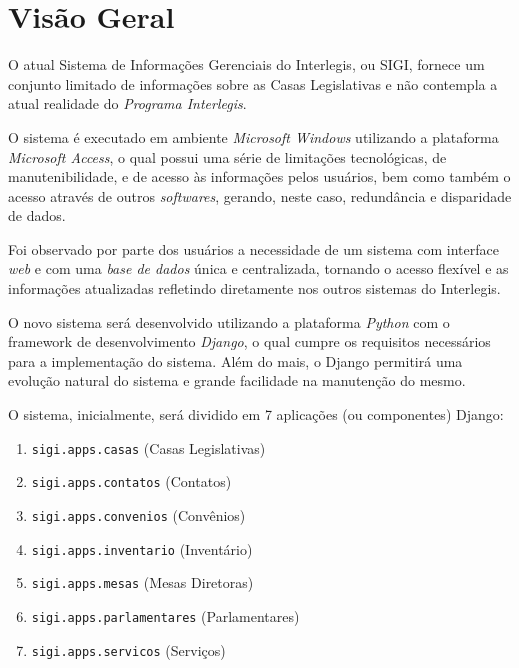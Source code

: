 %
%

\section{Visão Geral}
\label{sec:visaogeral}
O atual Sistema de Informações Gerenciais do Interlegis, ou SIGI,
fornece um conjunto limitado de informações sobre as Casas
Legislativas e não contempla a atual realidade do \emph{Programa
  Interlegis}.

O sistema é executado em ambiente \emph{Microsoft Windows} utilizando
a plataforma \emph{Microsoft Access}, o qual possui uma série de
limitações tecnológicas, de manutenibilidade, e de acesso às
informações pelos usuários, bem como também o acesso através de outros
\textit{softwares}, gerando, neste caso, redundância e disparidade de
dados.

Foi observado por parte dos usuários a necessidade de um sistema com
interface \textit{web} e com uma \emph{base de dados} única e
centralizada, tornando o acesso flexível e as informações atualizadas
refletindo diretamente nos outros sistemas do Interlegis.

O novo sistema será desenvolvido utilizando a plataforma \emph{Python}
com o framework de desenvolvimento \emph{Django}, o qual cumpre os
requisitos necessários para a implementação do sistema. Além do mais,
o Django permitirá uma evolução natural do sistema e grande facilidade
na manutenção do mesmo.

O sistema, inicialmente, será dividido em 7 aplicações (ou
componentes) Django:

\begin{enumerate}
\item \verb|sigi.apps.casas| (Casas Legislativas)
\item \verb|sigi.apps.contatos| (Contatos)
\item \verb|sigi.apps.convenios| (Convênios)
\item \verb|sigi.apps.inventario| (Inventário)
\item \verb|sigi.apps.mesas| (Mesas Diretoras)
\item \verb|sigi.apps.parlamentares| (Parlamentares)
\item \verb|sigi.apps.servicos| (Serviços)
\end{enumerate}

